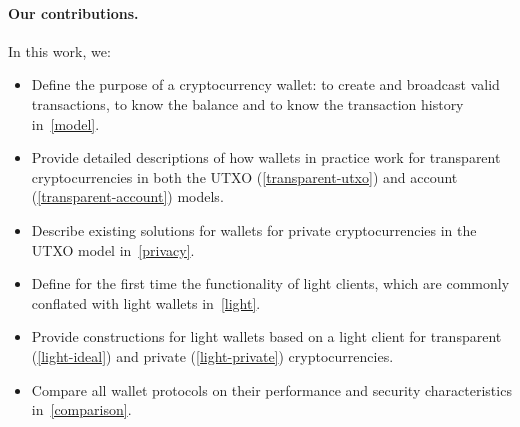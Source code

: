 \paragraph{Our contributions.} In this work, we:
\begin{itemize}
    \item Define the purpose of a cryptocurrency wallet: to create and broadcast valid transactions, to know the balance and to know the transaction history in~\cref{model}.
    \item Provide detailed descriptions of how wallets in practice work for transparent cryptocurrencies in both the UTXO (\cref{transparent-utxo}) and account (\cref{transparent-account}) models.
    \item Describe existing solutions for wallets for private cryptocurrencies in the UTXO model in~\cref{privacy}.
    \item Define for the first time the functionality of light clients, which are commonly conflated with light wallets in~\cref{light}.
    \item Provide constructions for light wallets based on a light client for transparent (\cref{light-ideal}) and private (\cref{light-private}) cryptocurrencies.
    \item Compare all wallet protocols on their performance and security characteristics in~\cref{comparison}.
\end{itemize}
